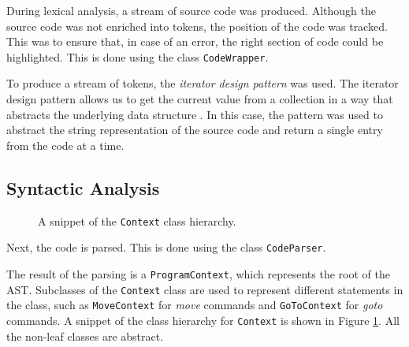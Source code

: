 During lexical analysis, a stream of source code was produced. Although the source code was not enriched into tokens, the position of the code was tracked. This was to ensure that, in case of an error, the right section of code could be highlighted. This is done using the class \texttt{CodeWrapper}. 

To produce a stream of tokens, the \emph{iterator design pattern} was used. The iterator design pattern allows us to get the current value from a collection in a way that abstracts the underlying data structure \citep{gamma1995design}. In this case, the pattern was used to abstract the string representation of the source code and return a single entry from the code at a time. 

\subsection{Syntactic Analysis}
\begin{figure}[htb]
    \centering
    \caption{A snippet of the \texttt{Context} class hierarchy.}
    \label{fig:context_hierarchy}
\end{figure}

Next, the code is parsed. This is done using the class \texttt{CodeParser}. 

The result of the parsing is a \texttt{ProgramContext}, which represents the root of the AST. Subclasses of the \texttt{Context} class are used to represent different statements in the class, such as \texttt{MoveContext} for \textit{move} commands and \texttt{GoToContext} for \textit{goto} commands. A snippet of the class hierarchy for \texttt{Context} is shown in Figure \ref{fig:context_hierarchy}. All the non-leaf classes are abstract.

